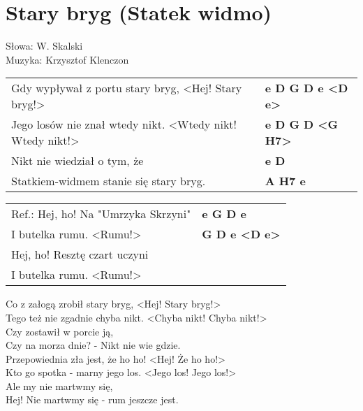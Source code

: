 \section{Stary bryg (Statek widmo)}

Słowa: W. Skalski\\
Muzyka: Krzysztof Klenczon

\vspace{2em}
\begin{tabular}{@{}p{9cm}@{}l@{}}
Gdy wypływał z portu stary bryg,  <Hej! Stary bryg!> & \bfseries  e D G D e <D e> \\
Jego losów nie znał wtedy nikt.   <Wtedy nikt! Wtedy nikt!> & \bfseries e D G D <G H7> \\
Nikt nie wiedział o tym, że & \bfseries  e D \\
Statkiem-widmem stanie się stary bryg. & \bfseries  A H7 e \\
\end{tabular}

\vspace{1em}
\begin{tabular}{@{}p{9cm}@{}l@{}}
Ref.: Hej, ho! Na "Umrzyka Skrzyni" & \bfseries  e G D e \\
I butelka rumu.  <Rumu!> & \bfseries G D e <D e>  \\
Hej, ho! Resztę czart uczyni \\
I butelka rumu.  <Rumu!> \\
\end{tabular}

\vspace{1em}
Co z załogą zrobił stary bryg,    <Hej! Stary bryg!> \\
Tego też nie zgadnie chyba nikt.  <Chyba nikt! Chyba nikt!> \\
Czy zostawił w porcie ją, \\
Czy na morza dnie? - Nikt nie wie gdzie. \\

Przepowiednia zła jest, że ho ho!  <Hej! Że ho ho!> \\
Kto go spotka - marny jego los.    <Jego los! Jego los!> \\
Ale my nie martwmy się, \\
Hej! Nie martwmy się - rum jeszcze jest. \\
